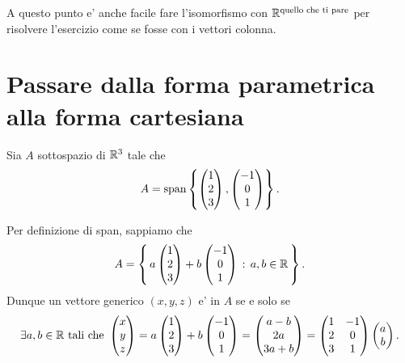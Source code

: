 A questo punto e' anche facile fare l'isomorfismo con $\mathbb{R}^{\text{quello che ti pare}}$ per risolvere l'esercizio come se fosse con i vettori colonna.

\section{Passare dalla forma parametrica alla forma cartesiana}

\begin{example}
    Sia $A$ sottospazio di $\mathbb{R}^3$ tale che \[
        A = \operatorname{span}\left\{\begin{pmatrix}
            1 \\ 2 \\ 3
        \end{pmatrix}, \begin{pmatrix}
            -1 \\ 0 \\ 1
        \end{pmatrix}\right\}.   
    \]

    Per definizione di span, sappiamo che \[
        A = \left\{\,a\begin{pmatrix}
            1 \\ 2 \\ 3
        \end{pmatrix} + b\begin{pmatrix}
            -1 \\ 0 \\ 1
        \end{pmatrix} \,:\, a, b \in \mathbb{R}\,\right\}.
    \] Dunque un vettore generico $(x, y, z)$ e' in $A$ se e solo se \[
        \exists a, b \in \mathbb{R} \text{ tali che } \begin{pmatrix}
            x \\ y \\ z
        \end{pmatrix} = a\begin{pmatrix}
            1 \\ 2 \\ 3
        \end{pmatrix} + b\begin{pmatrix}
            -1 \\ 0 \\ 1
        \end{pmatrix} = \begin{pmatrix}
            a-b \\ 2a \\ 3a+b
        \end{pmatrix} = \begin{pmatrix}
            1 & -1 \\ 2 & 0 \\ 3 & 1
        \end{pmatrix}\begin{pmatrix}
            a \\ b
        \end{pmatrix}.
    \]


\end{example}
